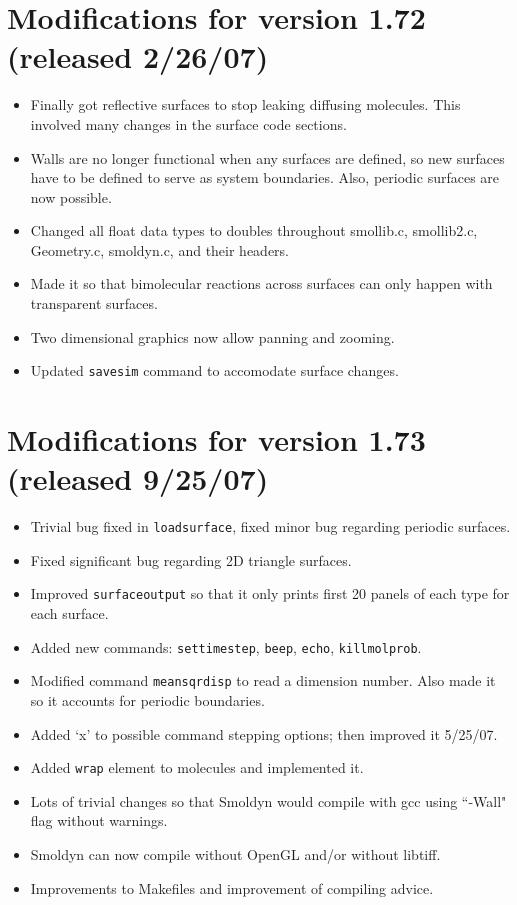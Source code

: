 \documentclass {scrbook}
\newcommand {\ttt} {\texttt}
\begin{document}
\section{Modifications for version 1.72 (released 2/26/07)}
\begin{itemize}
\item Finally got reflective surfaces to stop leaking diffusing molecules. This involved many changes in the surface code sections.
\item Walls are no longer functional when any surfaces are defined, so new surfaces have to be defined to serve as system boundaries. Also, periodic surfaces are now possible.
\item Changed all float data types to doubles throughout smollib.c, smollib2.c, Geometry.c, smoldyn.c, and their headers.
\item Made it so that bimolecular reactions across surfaces can only happen with transparent surfaces.
\item Two dimensional graphics now allow panning and zooming.
\item Updated \ttt{savesim} command to accomodate surface changes.
\end{itemize}

\section{Modifications for version 1.73 (released 9/25/07)}
\begin{itemize}
\item Trivial bug fixed in \ttt{loadsurface}, fixed minor bug regarding periodic surfaces.
\item Fixed significant bug regarding 2D triangle surfaces.
\item Improved \ttt{surfaceoutput} so that it only prints first 20 panels of each type for each surface.
\item Added new commands: \ttt{settimestep}, \ttt{beep}, \ttt{echo}, \ttt{killmolprob}.
\item Modified command \ttt{meansqrdisp} to read a dimension number. Also made it so it accounts for periodic boundaries.
\item Added `x' to possible command stepping options; then improved it 5/25/07.
\item Added \ttt{wrap} element to molecules and implemented it.
\item Lots of trivial changes so that Smoldyn would compile with gcc using ``-Wall" flag without warnings.
\item Smoldyn can now compile without OpenGL and/or without libtiff.
\item Improvements to Makefiles and improvement of compiling advice.
\end{itemize}
\end{document}
